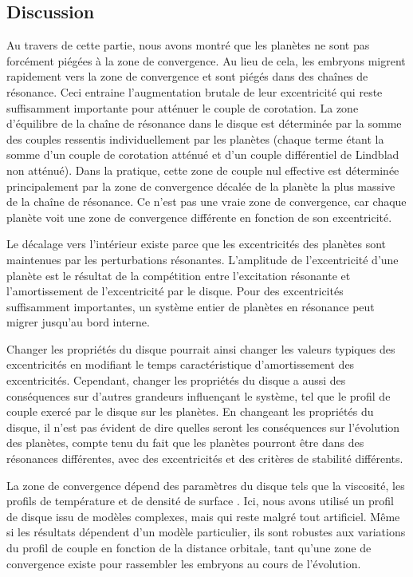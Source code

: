 \subsection{Discussion}
Au travers de cette partie, nous avons montré que les planètes ne sont pas forcément piégées à la zone de convergence. Au lieu de cela, les embryons migrent rapidement vers la zone de convergence et sont piégés dans des chaînes de résonance. Ceci entraine l'augmentation brutale de leur excentricité qui reste suffisamment importante pour atténuer le couple de corotation. La zone d'équilibre de la chaîne de résonance dans le disque est déterminée par la somme des couples ressentis individuellement par les planètes (chaque terme étant la somme d'un couple de corotation atténué et d'un couple différentiel de Lindblad non atténué). Dans la pratique, cette zone de couple nul effective est déterminée principalement par la zone de convergence décalée de la planète la plus massive de la chaîne de résonance. Ce n'est pas une vraie zone de convergence, car chaque planète voit une zone de convergence différente en fonction de son excentricité.

\bigskip

Le décalage vers l'intérieur existe parce que les excentricités des planètes sont maintenues par les perturbations résonantes. L'amplitude de l'excentricité d'une planète est le résultat de la compétition entre l'excitation résonante et l'amortissement de l'excentricité par le disque. Pour des excentricités suffisamment importantes, un système entier de planètes en résonance peut migrer jusqu'au bord interne.

Changer les propriétés du disque pourrait ainsi changer les valeurs typiques des excentricités en modifiant le temps caractéristique d'amortissement des excentricités. Cependant, changer les propriétés du disque a aussi des conséquences sur d'autres grandeurs influençant le système, tel que le profil de couple exercé par le disque sur les planètes. En changeant les propriétés du disque, il n'est pas évident de dire quelles seront les conséquences sur l'évolution des planètes, compte tenu du fait que les planètes pourront être dans des résonances différentes, avec des excentricités et des critères de stabilité différents. 

La zone de convergence dépend des paramètres du disque tels que la viscosité, les profils de température et de densité de surface \citep[voir par exemple][]{paardekooper2011torque}. Ici, nous avons utilisé un profil de disque issu de modèles complexes, mais qui reste malgré tout artificiel. Même si les résultats dépendent d'un modèle particulier, ils sont robustes aux variations du profil de couple en fonction de la distance orbitale, tant qu'une zone de convergence existe pour rassembler les embryons au cours de l'évolution. 

